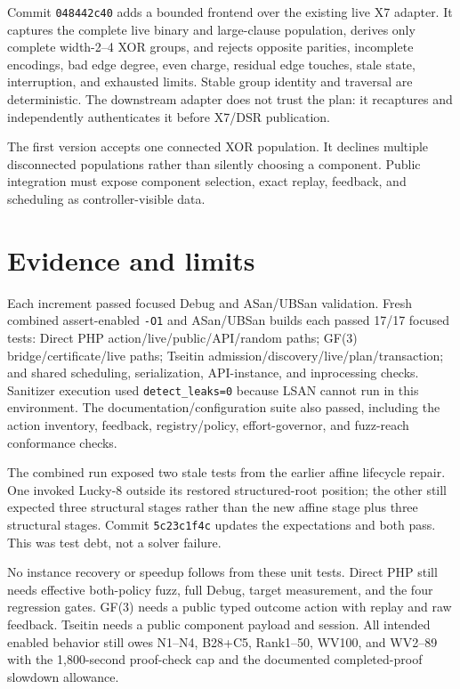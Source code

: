 \documentclass[11pt]{article}
\newcommand{\code}[1]{\texttt{#1}}
\begin{document}
Commit \code{048442c40} adds a bounded frontend over the existing live X7
adapter. It captures the complete live binary and large-clause population,
derives only complete width-2--4 XOR groups, and rejects opposite parities,
incomplete encodings, bad edge degree, even charge, residual edge touches,
stale state, interruption, and exhausted limits. Stable group identity and
traversal are deterministic. The downstream adapter does not trust the plan: it
recaptures and independently authenticates it before X7/DSR publication.

The first version accepts one connected XOR population. It declines multiple
disconnected populations rather than silently choosing a component. Public
integration must expose component selection, exact replay, feedback, and
scheduling as controller-visible data.

\section*{Evidence and limits}

Each increment passed focused Debug and ASan/UBSan validation. Fresh combined
assert-enabled \code{-O1} and ASan/UBSan builds each passed 17/17
focused tests: Direct PHP action/live/public/API/random paths; GF(3)
bridge/certificate/live paths; Tseitin admission/discovery/live/plan/transaction;
and shared scheduling, serialization, API-instance, and inprocessing checks.
Sanitizer execution used \code{detect\_leaks=0} because LSAN cannot run in this
environment. The documentation/configuration suite also passed, including the
action inventory, feedback, registry/policy, effort-governor, and fuzz-reach
conformance checks.

The combined run exposed two stale tests from the earlier affine lifecycle
repair. One invoked Lucky-8 outside its restored structured-root position; the
other still expected three structural stages rather than the new affine stage
plus three structural stages. Commit \code{5c23c1f4c} updates the expectations
and both pass. This was test debt, not a solver failure.

No instance recovery or speedup follows from these unit tests. Direct PHP still
needs effective both-policy fuzz, full Debug, target measurement, and the four
regression gates. GF(3) needs a public typed outcome action with replay and raw
feedback. Tseitin needs a public component payload and session. All intended
enabled behavior still owes N1--N4, B28+C5, Rank1--50, WV100, and WV2--89 with
the 1,800-second proof-check cap and the documented completed-proof slowdown
allowance.
\end{document}
